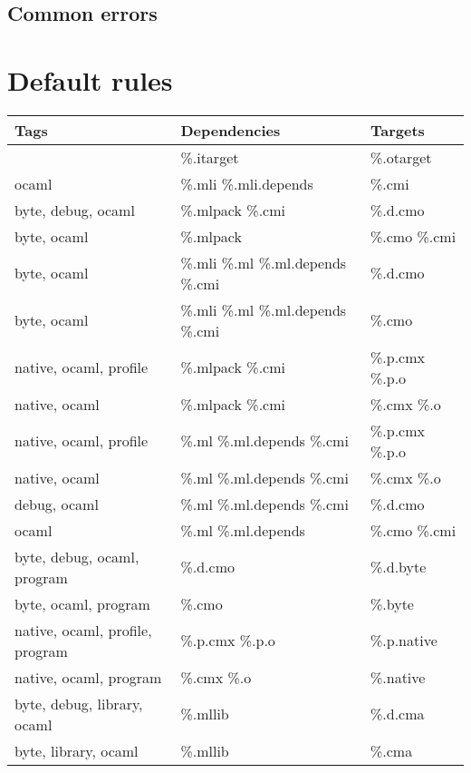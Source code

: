 \documentclass[12pt]{article}
\begin{document}
\subsection{Common errors}
\appendix
\section{Default rules}
\begin{center}
\small
\begin{tabular}{|l|l|p{5cm}|}
  \hline
   \textbf{Tags} & \textbf{Dependencies} & \textbf{Targets} \\
  \hline
  \hline
   &  \%.itarget  &  \%.otarget  \\
  \hline
   ocaml &  \%.mli \%.mli.depends  &  \%.cmi  \\
  \hline
   byte, debug, ocaml &  \%.mlpack \%.cmi &  \%.d.cmo  \\
  \hline
   byte, ocaml &  \%.mlpack  &  \%.cmo \%.cmi  \\
  \hline
   byte, ocaml &  \%.mli \%.ml \%.ml.depends \%.cmi  & \%.d.cmo  \\
  \hline
   byte, ocaml &  \%.mli \%.ml \%.ml.depends \%.cmi  & \%.cmo  \\
  \hline
   native, ocaml, profile & \%.mlpack \%.cmi  &  \%.p.cmx \%.p.o  \\
  \hline
   native, ocaml &  \%.mlpack \%.cmi &  \%.cmx \%.o  \\
  \hline
   native, ocaml, profile &  \%.ml \%.ml.depends \%.cmi  & \%.p.cmx \%.p.o  \\
  \hline
   native, ocaml &  \%.ml \%.ml.depends \%.cmi  & \%.cmx \%.o  \\
  \hline
   debug, ocaml &  \%.ml \%.ml.depends \%.cmi  & \%.d.cmo  \\
  \hline
   ocaml &  \%.ml \%.ml.depends  &  \%.cmo \%.cmi  \\
  \hline
   byte, debug, ocaml, program &  \%.d.cmo  &  \%.d.byte \\
  \hline
   byte, ocaml, program &  \%.cmo  &  \%.byte  \\
  \hline
   native, ocaml, profile, program &  \%.p.cmx \%.p.o  & \%.p.native  \\
  \hline
   native, ocaml, program &  \%.cmx \%.o  & \%.native  \\
  \hline
   byte, debug, library, ocaml &  \%.mllib  & \%.d.cma  \\
  \hline
   byte, library, ocaml &  \%.mllib  &  \%.cma  \\

\end{tabular}
\end{center}
\end{document}
